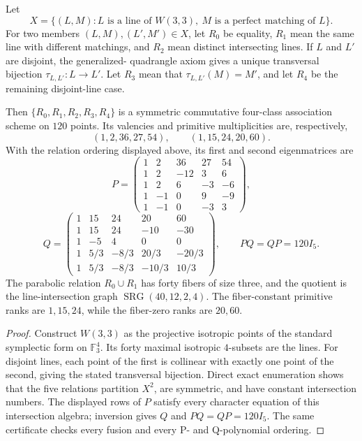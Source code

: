 \begin{theorem}
Let
\[
 X=\{(L,M):L\text{ is a line of }W(3,3),\ M\text{ is a perfect
 matching of }L\}.
\]
For two members $(L,M),(L',M')\in X$, let $R_0$ be equality, $R_1$ mean
the same line with different matchings, and $R_2$ mean distinct
intersecting lines.  If $L$ and $L'$ are disjoint, the generalized-
quadrangle axiom gives a unique transversal bijection $\tau_{L,L'}:L\to
L'$.  Let $R_3$ mean that $\tau_{L,L'}(M)=M'$, and let $R_4$ be the
remaining disjoint-line case.

Then $\{R_0,R_1,R_2,R_3,R_4\}$ is a symmetric commutative four-class
association scheme on $120$ points.  Its valencies and primitive
multiplicities are, respectively,
\[
 \boxed{(1,2,36,27,54)},
 \qquad
 \boxed{(1,15,24,20,60)}.
\]
With the relation ordering displayed above, its first and second
eigenmatrices are
\[
P=\begin{pmatrix}
1&2&36&27&54\\
1&2&-12&3&6\\
1&2&6&-3&-6\\
1&-1&0&9&-9\\
1&-1&0&-3&3
\end{pmatrix},
\]
\[
Q=\begin{pmatrix}
1&15&24&20&60\\
1&15&24&-10&-30\\
1&-5&4&0&0\\
1&5/3&-8/3&20/3&-20/3\\
1&5/3&-8/3&-10/3&10/3
\end{pmatrix},
\qquad PQ=QP=120I_5.
\]
The parabolic relation $R_0\cup R_1$ has forty fibers of size three,
and the quotient is the line-intersection graph
$\operatorname{SRG}(40,12,2,4)$.  The fiber-constant primitive ranks are
$1,15,24$, while the fiber-zero ranks are $20,60$.
\end{theorem}

\begin{proof}
Construct $W(3,3)$ as the projective isotropic points of the standard
symplectic form on $\mathbb F_3^4$.  Its forty maximal isotropic
$4$-subsets are the lines.  For disjoint lines, each point of the first
is collinear with exactly one point of the second, giving the stated
transversal bijection.  Direct exact enumeration shows that the five
relations partition $X^2$, are symmetric, and have constant
intersection numbers.  The displayed rows of $P$ satisfy every
character equation of this intersection algebra; inversion gives $Q$
and $PQ=QP=120I_5$.  The same certificate checks every fusion and every
P- and Q-polynomial ordering.
\end{proof}

